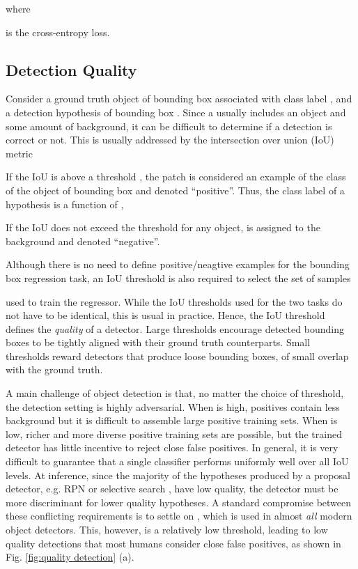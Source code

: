 \documentclass[10pt,journal,compsoc]{IEEEtran}
\begin{document}
where

is the cross-entropy loss.


\subsection{Detection Quality}

Consider a ground truth object of bounding
box  associated with class label , and a detection hypothesis 
of bounding box . Since a  usually includes an object and
some amount of background, it can be difficult to determine if a detection
is correct or not. This is usually addressed by the intersection over union
(IoU) metric

If the IoU is above a threshold , the patch is considered an example of
the class of the object of bounding box  and denoted ``positive''.
Thus, the class label of a hypothesis  is a function of ,

If the IoU does not exceed the threshold for any object,  is
assigned to the background and denoted ``negative''.

Although there is no need to define positive/neagtive examples for the
bounding box regression task, an IoU threshold  is also required to
select the set of samples

used to train the regressor. While the IoU thresholds used for the two tasks
do not have to be identical, this is usual in practice. Hence,
the IoU threshold  defines the \textit{quality} of a detector.
Large thresholds encourage detected bounding boxes to be
tightly aligned with their ground truth counterparts.
Small thresholds reward detectors that produce loose bounding boxes,
of small overlap with the ground truth.

A main challenge of object detection is that, no matter the
choice of threshold, the detection setting is highly adversarial.
When  is high, positives contain less background but it is difficult to
assemble large positive training sets. When  is low, richer and
more diverse positive training sets are possible, but the trained
detector has little incentive to reject close false positives. In general,
it is very difficult to guarantee that a single
classifier performs uniformly well over all IoU levels. At inference,
since the majority of the hypotheses produced by a proposal detector,
e.g. RPN \cite{DBLP:conf/nips/RenHGS15} or selective
search \cite{DBLP:journals/ijcv/UijlingsSGS13}, have low quality, the detector
must be more discriminant for lower quality hypotheses. A standard
compromise between these conflicting requirements is to settle on , which is used in almost {\it all} modern object detectors.
This, however, is a relatively low threshold, leading to low quality
detections that most humans consider close false positives, as shown in
Fig. \ref{fig:quality detection} (a).
\end{document}
